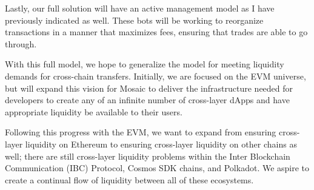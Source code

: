 Lastly, our full solution will have an active management model as I have previously indicated as well. These bots will be working to reorganize transactions in a manner that maximizes fees, ensuring that trades are able to go through.

With this full model, we hope to generalize the model for meeting liquidity demands for cross-chain transfers. Initially, we are focused on the EVM universe, but will expand this vision for Mosaic to deliver the infrastructure needed for developers to create any of an infinite number of cross-layer dApps and have appropriate liquidity be available to their users.

Following this progress with the EVM, we want to expand from ensuring cross-layer liquidity on Ethereum to ensuring cross-layer liquidity on other chains as well; there are still cross-layer liquidity problems within the Inter Blockchain Communication (IBC) Protocol, Cosmos SDK chains, and Polkadot. We aspire to create a continual flow of liquidity between all of these ecosystems.
